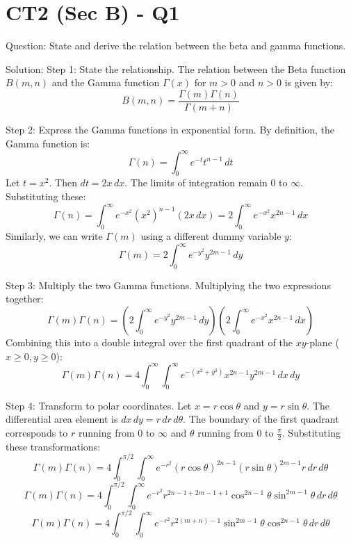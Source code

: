 \documentclass{article}
\begin{document}
\section*{CT2 (Sec B) - Q1}
Question:
State and derive the relation between the beta and gamma functions.

Solution:
Step 1: State the relationship.
The relation between the Beta function $B(m, n)$ and the Gamma function $\Gamma(x)$ for $m > 0$ and $n > 0$ is given by:
\[
B(m, n) = \frac{\Gamma(m) \Gamma(n)}{\Gamma(m+n)}
\]

Step 2: Express the Gamma functions in exponential form.
By definition, the Gamma function is:
\[
\Gamma(n) = \int_0^\infty e^{-t} t^{n-1} \, dt
\]
Let $t = x^2$. Then $dt = 2x \, dx$. The limits of integration remain $0$ to $\infty$. Substituting these:
\[
\Gamma(n) = \int_0^\infty e^{-x^2} (x^2)^{n-1} (2x \, dx) = 2 \int_0^\infty e^{-x^2} x^{2n-1} \, dx
\]
Similarly, we can write $\Gamma(m)$ using a different dummy variable $y$:
\[
\Gamma(m) = 2 \int_0^\infty e^{-y^2} y^{2m-1} \, dy
\]

Step 3: Multiply the two Gamma functions.
Multiplying the two expressions together:
\[
\Gamma(m) \Gamma(n) = \left( 2 \int_0^\infty e^{-y^2} y^{2m-1} \, dy \right) \left( 2 \int_0^\infty e^{-x^2} x^{2n-1} \, dx \right)
\]
Combining this into a double integral over the first quadrant of the $xy$-plane ($x \ge 0, y \ge 0$):
\[
\Gamma(m) \Gamma(n) = 4 \int_0^\infty \int_0^\infty e^{-(x^2+y^2)} x^{2n-1} y^{2m-1} \, dx \, dy
\]

Step 4: Transform to polar coordinates.
Let $x = r \cos \theta$ and $y = r \sin \theta$.
The differential area element is $dx \, dy = r \, dr \, d\theta$.
The boundary of the first quadrant corresponds to $r$ running from $0$ to $\infty$ and $\theta$ running from $0$ to $\frac{\pi}{2}$.
Substituting these transformations:
\[
\Gamma(m) \Gamma(n) = 4 \int_0^{\pi/2} \int_0^\infty e^{-r^2} (r \cos \theta)^{2n-1} (r \sin \theta)^{2m-1} r \, dr \, d\theta
\]
\[
\Gamma(m) \Gamma(n) = 4 \int_0^{\pi/2} \int_0^\infty e^{-r^2} r^{2n-1+2m-1+1} \cos^{2n-1} \theta \sin^{2m-1} \theta \, dr \, d\theta
\]
\[
\Gamma(m) \Gamma(n) = 4 \int_0^{\pi/2} \int_0^\infty e^{-r^2} r^{2(m+n)-1} \sin^{2m-1} \theta \cos^{2n-1} \theta \, dr \, d\theta
\]
\end{document}
